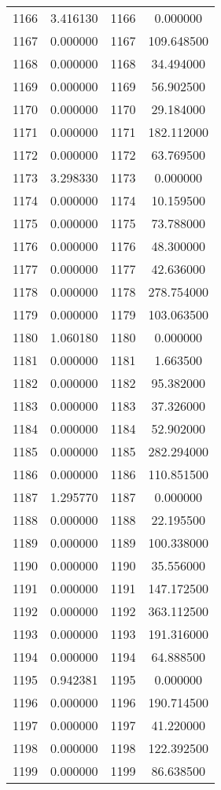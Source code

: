 \documentclass[12pt]{article}
\begin{document}
\begin{longtable}{@{}cccc@{}}
1166 & 3.416130 & 1166 & 0.000000 \\
1167 & 0.000000 & 1167 & 109.648500 \\
1168 & 0.000000 & 1168 & 34.494000 \\
1169 & 0.000000 & 1169 & 56.902500 \\
1170 & 0.000000 & 1170 & 29.184000 \\
1171 & 0.000000 & 1171 & 182.112000 \\
1172 & 0.000000 & 1172 & 63.769500 \\
1173 & 3.298330 & 1173 & 0.000000 \\
1174 & 0.000000 & 1174 & 10.159500 \\
1175 & 0.000000 & 1175 & 73.788000 \\
1176 & 0.000000 & 1176 & 48.300000 \\
1177 & 0.000000 & 1177 & 42.636000 \\
1178 & 0.000000 & 1178 & 278.754000 \\
1179 & 0.000000 & 1179 & 103.063500 \\
1180 & 1.060180 & 1180 & 0.000000 \\
1181 & 0.000000 & 1181 & 1.663500 \\
1182 & 0.000000 & 1182 & 95.382000 \\
1183 & 0.000000 & 1183 & 37.326000 \\
1184 & 0.000000 & 1184 & 52.902000 \\
1185 & 0.000000 & 1185 & 282.294000 \\
1186 & 0.000000 & 1186 & 110.851500 \\
1187 & 1.295770 & 1187 & 0.000000 \\
1188 & 0.000000 & 1188 & 22.195500 \\
1189 & 0.000000 & 1189 & 100.338000 \\
1190 & 0.000000 & 1190 & 35.556000 \\
1191 & 0.000000 & 1191 & 147.172500 \\
1192 & 0.000000 & 1192 & 363.112500 \\
1193 & 0.000000 & 1193 & 191.316000 \\
1194 & 0.000000 & 1194 & 64.888500 \\
1195 & 0.942381 & 1195 & 0.000000 \\
1196 & 0.000000 & 1196 & 190.714500 \\
1197 & 0.000000 & 1197 & 41.220000 \\
1198 & 0.000000 & 1198 & 122.392500 \\
1199 & 0.000000 & 1199 & 86.638500 \\

\end{longtable}
\end{document}
